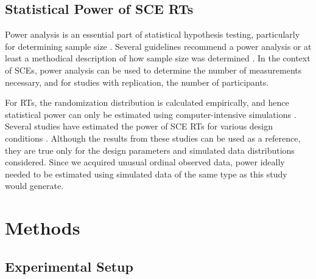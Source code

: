 \documentclass{article}
\begin{document}
\subsection{Statistical Power of SCE RTs }

Power analysis is an essential part of statistical hypothesis testing, particularly for determining sample size \textcite{Cohen1988}. Several guidelines recommend a power analysis or at least a methodical description of how sample size was determined \textcite{Vohra2015, Willkinson1999}. In the context of SCEs, power analysis can be used to determine the number of measurements necessary, and for studies with replication, the number of participants.

For RTs, the randomization distribution is calculated empirically, and hence statistical power can only be estimated using computer-intensive simulations \textcite{Onghena1992, Ferron1995}. Several studies have estimated the power of SCE RTs for various design conditions \textcite{Ferron1996, Ferron1995, Michiels2018, Bouwmeester2020, Ferron2002, De2020}. Although the results from these studies can be used as a reference, they are true only for the design parameters and simulated data distributions considered. Since we acquired unusual ordinal observed data, power ideally needed to be estimated using simulated data of the same type as this study would generate.

\section{Methods}

\subsection{Experimental Setup}
\end{document}
